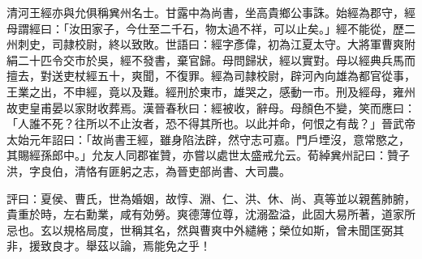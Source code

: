 \begin{pinyinscope}
清河王經亦與允俱稱兾州名士。甘露中為尚書，坐高貴鄉公事誅。始經為郡守，經母謂經曰：「汝田家子，今仕至二千石，物太過不祥，可以止矣。」經不能從，歷二州刺史，司隷校尉，終以致敗。世語曰：經字彥偉，初為江夏太守。大將軍曹爽附絹二十匹令交市於吳，經不發書，棄官歸。母問歸狀，經以實對。母以經典兵馬而擅去，對送吏杖經五十，爽聞，不復罪。經為司隷校尉，辟河內向雄為都官從事，王業之出，不申經，竟以及難。經刑於東市，雄哭之，感動一市。刑及經母，雍州故吏皇甫晏以家財收葬焉。漢晉春秋曰：經被收，辭母。母顏色不變，笑而應曰：「人誰不死？往所以不止汝者，恐不得其所也。以此并命，何恨之有哉？」晉武帝太始元年詔曰：「故尚書王經，雖身陷法辟，然守志可嘉。門戶堙沒，意常愍之，其賜經孫郎中。」允友人同郡崔贊，亦嘗以處世太盛戒允云。荀綽兾州記曰：贊子洪，字良伯，清恪有匪躬之志，為晉吏部尚書、大司農。

評曰：夏侯、曹氏，世為婚姻，故惇、淵、仁、洪、休、尚、真等並以親舊肺腑，貴重於時，左右勳業，咸有効勞。爽德薄位尊，沈溺盈溢，此固大易所著，道家所忌也。玄以規格局度，世稱其名，然與曹爽中外繾綣；榮位如斯，曾未聞匡弼其非，援致良才。舉茲以論，焉能免之乎！


\end{pinyinscope}